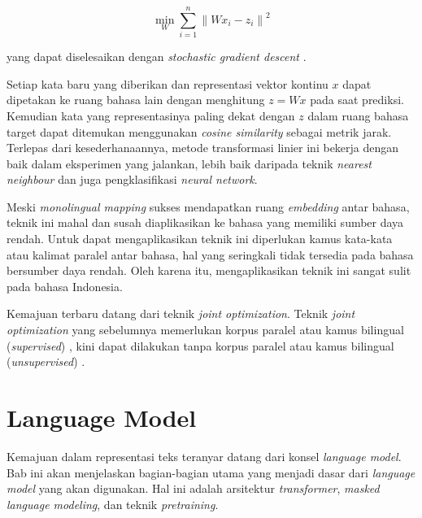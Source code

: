     \begin{equation}
        \min_{W}\sum_{i=1}^{n}\left \| Wx_i-z_i \right \|^2
        \label{eq:2}
    \end{equation}

    yang dapat diselesaikan dengan \textit{stochastic gradient descent} \parencite{MikolovExploiting}.

    Setiap kata baru yang diberikan dan representasi vektor kontinu \(x\) dapat dipetakan ke ruang bahasa lain dengan menghitung \(z = W x\) pada saat prediksi. Kemudian kata yang representasinya paling dekat dengan \(z\) dalam ruang bahasa target dapat ditemukan menggunakan \textit{cosine similarity} sebagai metrik jarak. Terlepas dari kesederhanaannya, metode transformasi linier ini bekerja dengan baik dalam eksperimen yang \parencite{MikolovExploiting} jalankan, lebih baik daripada teknik \textit{nearest neighbour} dan juga pengklasifikasi \textit{neural network}.

    Meski \textit{monolingual mapping} sukses mendapatkan ruang \textit{embedding} antar bahasa, teknik ini mahal dan susah diaplikasikan ke bahasa yang memiliki sumber daya rendah. Untuk dapat mengaplikasikan teknik ini diperlukan kamus kata-kata atau kalimat paralel antar bahasa, hal yang seringkali tidak tersedia pada bahasa bersumber daya rendah. Oleh karena itu, mengaplikasikan teknik ini sangat sulit pada bahasa Indonesia. 

    Kemajuan terbaru datang dari teknik \textit{joint optimization}. Teknik \textit{joint optimization} yang sebelumnya memerlukan korpus paralel atau kamus bilingual (\textit{supervised}) \parencite{Xing_Wang_Liu_Lin}, kini dapat dilakukan tanpa korpus paralel atau kamus bilingual (\textit{unsupervised}) \parencite{Devlin_Chang_Lee_Toutanova_2019} \parencite{LampleConneau2019}. 

\section{Language Model}
    Kemajuan dalam representasi teks teranyar datang dari konsel \textit{language model}. Bab ini akan menjelaskan bagian-bagian utama yang menjadi dasar dari \textit{language model} yang akan digunakan. Hal ini adalah arsitektur \textit{transformer}, \textit{masked language modeling}, dan teknik \textit{pretraining}.

